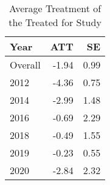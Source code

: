 \begin{table}\centering
\caption{Average Treatment of the Treated for Study}
\label{}
\begin{tabular}[t]{l|r|r}
\hline
Year & ATT & SE\\
\hline
Overall & -1.94 & 0.99\\
\hline
2012 & -4.36 & 0.75\\
\hline
2014 & -2.99 & 1.48\\
\hline
2016 & -0.69 & 2.29\\
\hline
2018 & -0.49 & 1.55\\
\hline
2019 & -0.23 & 0.55\\
\hline
2020 & -2.84 & 2.32\\
\hline
\end{tabular}
\end{table}